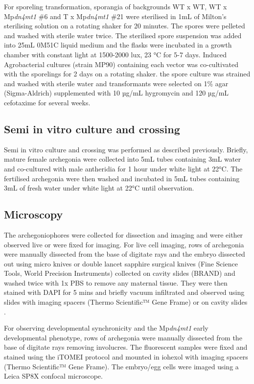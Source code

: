 For sporeling transformation, sporangia of backgrounds WT x WT, WT x Mp\textit{dn4mt1} \#6 and T x Mp\textit{dn4mt1} \#21 were sterilised in 1mL of Milton's sterilising solution on a rotating shaker for 20 minutes. The spores were pelleted and washed with sterile water twice. The sterilised spore suspension was added into 25mL 0M51C liquid medium and the flasks were incubated in a growth chamber with constant light at 1500-2000 lux, 23 °C for 5-7 days. Induced Agrobacterial cultures (strain MP90) containing each vector was co-cultivated with the sporelings for 2 days on a rotating shaker. the spore culture was strained and washed with sterile water and transformants were selected on 1\% agar (Sigma-Aldrich) supplemented with 10 µg/mL hygromycin and 120 µg/mL cefotaxime for several weeks\citep{RN146}.

\subsection{Semi in vitro culture and crossing}

Semi in vitro culture and crossing was performed as described previously\citep{RN139}. Briefly, mature female archegonia were collected into 5mL tubes containing 3mL water and co-cultured with male antheridia for 1 hour under white light at 22°C. The fertilised archegonia were then washed and incubated in 5mL tubes containing 3mL of fresh water under white light at 22°C until observation.

\subsection{Microscopy} 

The archegoniophores were collected for dissection and imaging and were either observed live or were fixed for imaging. For live cell imaging, rows of archegonia were manually dissected from the base of digitate rays and the embryo dissected out using micro knives or double lancet sapphire surgical knives (Fine Science Tools, World Precision Instruments) collected on cavity slides (BRAND\textregistered) and washed twice with 1x PBS to remove any maternal tissue. They were then stained with DAPI for 5 mins and briefly vacuum infiltrated and observed using slides with imaging spacers (Thermo Scientific™ Gene Frame) or on cavity slides \citep{RN139}. 

For observing developmental synchronicity and the Mp\textit{dn4mt1} early developmental phenotype,  rows of archegonia were manually dissected from the base of digitate rays removing involucres. The fluorescent samples were fixed and stained using the iTOMEI protocol \citep{RN148} and mounted in iohexol with imaging spacers (Thermo Scientific™ Gene Frame). The embryo/egg cells were imaged using a Leica SP8X confocal microscope.

